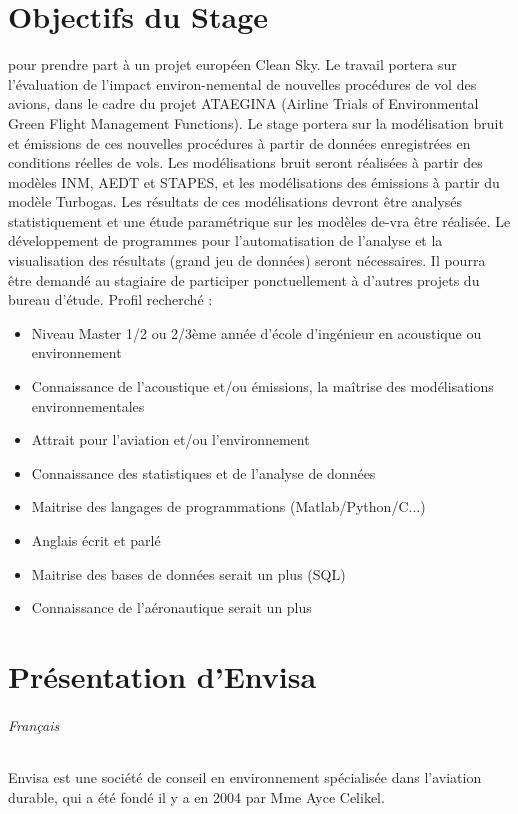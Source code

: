 \documentclass[a4paper]{article}
\begin{document}
    \part{Objectifs du Stage}
    pour prendre part à un projet européen Clean Sky. Le travail portera sur l'évaluation de l'impact environ-nemental de nouvelles procédures de vol des avions, dans le cadre du projet ATAEGINA (Airline Trials of Environmental Green Flight Management Functions).
    Le stage portera sur la modélisation bruit et émissions de ces nouvelles procédures à partir de données enregistrées en conditions réelles de vols. Les modélisations bruit seront réalisées à partir des modèles INM, AEDT et STAPES, et les modélisations des émissions à partir du modèle Turbogas. Les résultats de ces modélisations devront être analysés statistiquement et une étude paramétrique sur les modèles de-vra être réalisée. Le développement de programmes pour l'automatisation de l'analyse et la visualisation des résultats (grand jeu de données) seront nécessaires. Il pourra être demandé au stagiaire de participer ponctuellement à d'autres projets du bureau d'étude.
    Profil recherché :
    \begin{itemize}
        \item Niveau Master 1/2 ou 2/3ème année d'école d'ingénieur en acoustique ou environnement
        \item Connaissance de l'acoustique et/ou émissions, la maîtrise des modélisations environnementales
        \item Attrait pour l'aviation et/ou l'environnement
        \item Connaissance des statistiques et de l'analyse de données
        \item Maitrise des langages de programmations (Matlab/Python/C...)
        \item Anglais écrit et parlé
        \item Maitrise des bases de données serait un plus (SQL)
        \item Connaissance de l'aéronautique serait un plus
    \end{itemize}
    
    
    \newpage
    \part{Présentation d'Envisa}
    \paragraph{Français}
    Envisa est une société de conseil en environnement spécialisée dans l'aviation durable, qui a été fondé il y a en 2004 par Mme Ayce Celikel.
\end{document}
